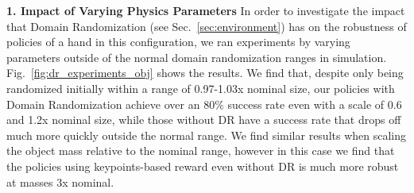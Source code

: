 \documentclass[letterpaper, 10 pt, conference]{ieeeconf}  %
\newcommand{\secref}[1]{Sec.~\ref{#1}}
\newcommand{\figref}[1]{Fig.~\ref{#1}}
\begin{document}
\noindent \textbf{1. Impact of Varying Physics Parameters} In order to investigate the impact that Domain Randomization (see \secref{sec:environment}) has on the robustness of policies of a hand in this configuration, we ran experiments by varying parameters outside of the normal domain randomization ranges in simulation. \figref{fig:dr_experiments_obj} shows the results. We find that, despite only being randomized initially within a range of 0.97-1.03x nominal size, our policies with Domain Randomization achieve over an 80\% success rate even with a scale of 0.6 and 1.2x nominal size, while those without DR have a success rate that drops off much more quickly outside the normal range. We find similar results when scaling the object mass relative to the nominal range, however in this case we find that the policies using keypoints-based reward even without DR is much more robust at masses 3x nominal.




\end{document}
